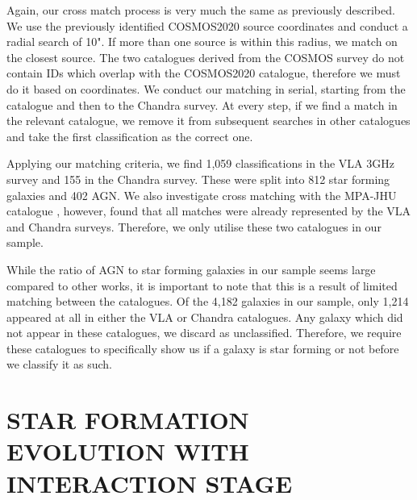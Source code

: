 \documentclass[fleqn,usenatbib]{mnras}
\begin{document}

Again, our cross match process is very much the same as previously described. We use the previously identified COSMOS2020 source coordinates and conduct a radial search of 10". If more than one source is within this radius, we match on the closest source. The two catalogues derived from the COSMOS survey do not contain IDs which overlap with the COSMOS2020 catalogue, therefore we must do it based on coordinates. We conduct our matching in serial, starting from the \citet{2017A&A...602A...6S} catalogue and then to the Chandra survey. At every step, if we find a match in the relevant catalogue, we remove it from subsequent searches in other catalogues and take the first classification as the correct one.

Applying our matching criteria, we find 1,059 classifications in the VLA 3GHz survey and 155 in the Chandra survey. These were split into 812 star forming galaxies and 402 AGN. We also investigate cross matching with the MPA-JHU catalogue \citep{2003MNRAS.341...33K, 2004MNRAS.351.1151B, 2007ApJS..173..267S}, however, found that all matches were already represented by the VLA and Chandra surveys. Therefore, we only utilise these two catalogues in our sample.

While the ratio of AGN to star forming galaxies in our sample seems large compared to other works, it is important to note that this is a result of limited matching between the catalogues. Of the 4,182 galaxies in our sample, only 1,214 appeared at all in either the VLA or Chandra catalogues. Any galaxy which did not appear in these catalogues, we discard as unclassified. Therefore, we require these catalogues to specifically show us if a galaxy is star forming or not before we classify it as such.

\section{STAR FORMATION EVOLUTION WITH INTERACTION STAGE}\label{results}
\end{document}
